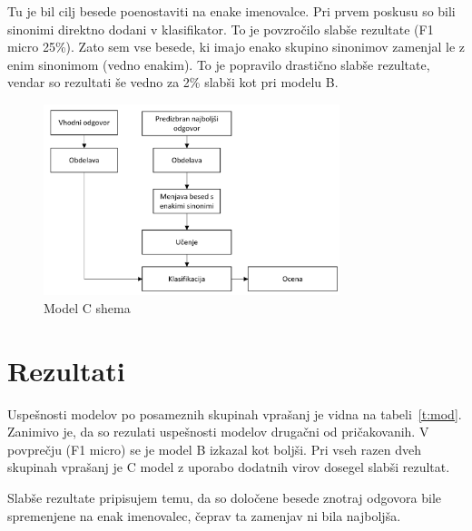 \documentclass[journal]{IEEEtran}
\begin{document}
Tu je bil cilj besede poenostaviti na enake imenovalce. Pri prvem poskusu so bili sinonimi direktno dodani v klasifikator. To je povzročilo slabše rezultate (F1 micro 25\%). Zato sem vse besede, ki imajo enako skupino sinonimov zamenjal le z enim sinonimom (vedno enakim). To je popravilo drastično slabše rezultate, vendar so rezultati še vedno za 2\% slabši kot pri modelu B.

\begin{figure}[h]
	\centering
	\includegraphics[width=3.4in]{C}
	\caption{Model C shema}
	\label{sl:mc}
\end{figure}

\section{Rezultati}
Uspešnosti modelov po posameznih skupinah vprašanj je vidna na tabeli~\ref{t:mod}. Zanimivo je, da so rezulati uspešnosti modelov drugačni od pričakovanih. V povprečju (F1 micro) se je model B izkazal kot boljši. Pri vseh razen dveh skupinah vprašanj je C model z uporabo dodatnih virov dosegel slabši rezultat.

Slabše rezultate pripisujem temu, da so določene besede znotraj odgovora bile spremenjene na enak imenovalec, čeprav ta zamenjav ni bila najboljša.
\end{document}
